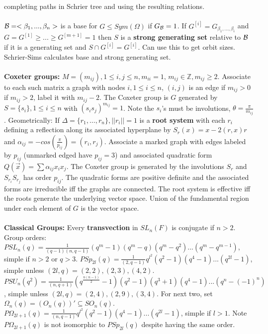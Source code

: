 completing paths in Schrier tree and using the resulting relations.\\
\\
${\cal B}= < \beta_1 , ... , \beta_n>$ is a base for 
$G \le Sym(\Omega)$ if $G_{\cal B} = 1$.
If $G^{[i]} = G_{\beta_1 , ..., \beta_i}$ and
$G=G^{[1]} \ge ... \ge G^{[m+1]}=1$ then
$S$ is a {\bf strong generating set} relative to ${\cal B}$ if
it is a generating set and $S \cap G^{[i]} = G^{[i]}$.  Can use this to get
orbit sizes.
Schrier-Sims calculates base and strong generating set.\\
\\
{\bf Coxeter groups:} $M= (m_{ij}), 1 \le i,j \le n, m_{ii}=1$, 
$m_{ij} \in {\mathbb Z}, m_{ij} \ge 2$.  Associate to each
such matrix a graph with nodes $i, 1 \le i \le n$, $(i,j)$ is an edge if $m_{ij}>0$ if
$m_{ij}>2$, label it with $m_{ij}-2$.  The Coxeter group is $G$ generated by
$S= \{ s_i \} , 1 \le i \le n$ with $(s_i s_j)^{m_{ij}}=1$.  Note the $s_i$'s must be
involutions, $\theta= {\frac {\pi} {m_{ij}}}$. 
Geometrically: If $\Delta= \{ r_1 , \ldots , r_n \}, ||r_i||=1$ 
is a {\bf root system} with each
$r_i$ defining a reflection along its associated hyperplane by $S_r (x) = x-2(r,x)r$ and
$\alpha_{ij}= -cos({\frac {\pi} {p_{ij}}})= (r_i , r_j)$.  Associate a marked
graph with edges labeled by $p_{ij}$ (unmarked edged have $p_{ij}=3$) and associated
quadratic form $Q({\vec x})= \sum \alpha_{ij} x_i x_j$.  The Coxeter group is generated
by the involutions $S_r$ and $S_{r_i}S_{r_j}$ has order $p_{ij}$.  The quadratic forms
are positive definite and the associated forms are irreducible iff the graphs are
connected.  The root system is effective iff the roots generate the underlying vector
space.  Union of the fundamental region under each element of $G$ is the vector
space.\\
\\
{\bf Classical Groups:}
Every {\bf transvection} in $SL_n(F)$ is conjugate if $n>2$.  Group orders:
$PSL_n(q)= {\frac 1 {(q-1)(n,q-1)}} (q^{m} -1) (q^{m} -q) (q^{m} -q^{2}) ...  (q^{m} -q^{m-1})$,
simple if $n>2$ or $q>3$.
$PSp_{2l}(q)= {\frac 1 {(2,q-1)}} q^{l^2}(q^{2} -1) (q^{4} -1) ...  (q^{2l} -1)$,
simple unless $(2l,q)= (2,2), (2,3), (4,2)$.
$PSU_n(q^2)= {\frac 1 {(n,q+1)}} (q^{\frac {n(n-1)} 2} -1) (q^{2} -1) (q^{3} +1) 
(q^4 -1)...  (q^{n} - (-1)^n)$,
simple unless $(2l,q)= (2,4), (2,9), (3,4)$.
For next two, set $\Omega_n(q)= (O_n(q))' \subseteq SO_n(q)$.
$P\Omega_{2l+1}(q)= {\frac 1 {(n,q-1)}}
q^{l^2}(q^{2} -1) (q^{4} -1) ...  (q^{2l} -1)$,
simple if $l>1$.  Note 
$P\Omega_{2l+1}(q)$ is not isomorphic to $PSp_{2l}(q)$ despite having the same order.
